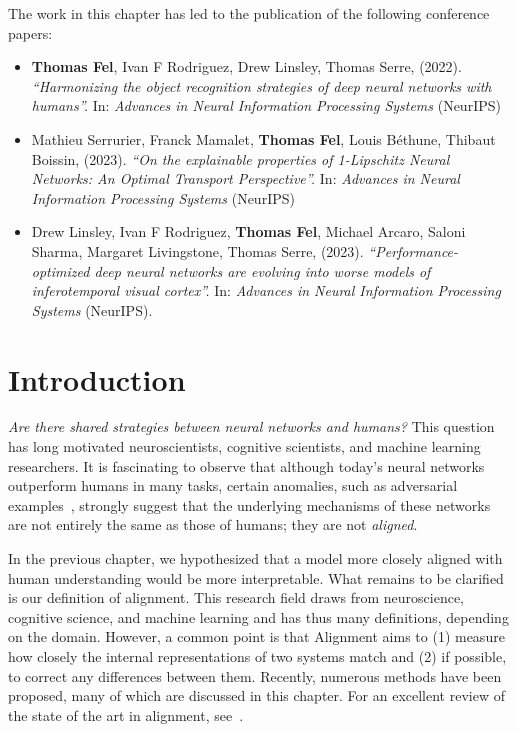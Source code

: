 The work in this chapter has led to the publication of the following conference papers:
{\small{
\begin{itemize}

    \item \textbf{Thomas Fel}\equal, Ivan F Rodriguez\equal, Drew Linsley\equal, Thomas Serre, (2022). \textit{``Harmonizing the object recognition strategies of deep neural networks with humans''.} In: \textit{Advances in Neural Information Processing Systems}  (\textcolor{confcolor}{NeurIPS})

    \item Mathieu Serrurier, Franck Mamalet, \textbf{Thomas Fel}, Louis Béthune, Thibaut Boissin, (2023). \textit{``On the explainable properties of 1-Lipschitz Neural Networks: An Optimal Transport Perspective''.} In: \textit{Advances in Neural Information Processing Systems} (\textcolor{confcolor}{NeurIPS})

    \item Drew Linsley, Ivan F Rodriguez, \textbf{Thomas Fel}, Michael Arcaro, Saloni Sharma, Margaret Livingstone, Thomas Serre, (2023). \textit{``Performance-optimized deep neural networks are evolving into worse models of inferotemporal visual cortex''.} In: \textit{Advances in Neural Information Processing Systems} (\textcolor{confcolor}{NeurIPS}).

\end{itemize}
}}

\minitoc
\clearpage

\section{Introduction}

\textit{Are there shared strategies between neural networks and humans?} This question has long motivated neuroscientists, cognitive scientists, and machine learning researchers. It is fascinating to observe that although today's neural networks outperform humans in many tasks, certain anomalies, such as adversarial examples~\cite{goodfellow2014explaining}, strongly suggest that the underlying mechanisms of these networks are not entirely the same as those of humans; they are not \textit{aligned}.

In the previous chapter, we hypothesized that a model more closely aligned with human understanding would be more interpretable. What remains to be clarified is our definition of alignment. This research field draws from neuroscience, cognitive science, and machine learning and has thus many definitions, depending on the domain. However, a common point is that Alignment aims to (1) measure how closely the internal representations of two systems match and (2) if possible, to correct any differences between them. Recently, numerous methods have been proposed, many of which are discussed in this chapter. For an excellent review of the state of the art in alignment, see~\cite{sucholutsky2023getting}.


